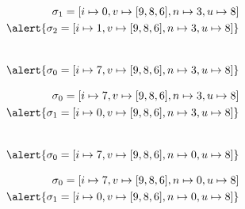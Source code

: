 \documentclass{beamer}
\begin{document}
\begin{frame}
\begin{align*}
  \sigma_1=[i\mapsto0,v\mapsto[9,8,6],n\mapsto3,u\mapsto8]
\\
  \alert{\sigma_2=[i\mapsto1,v\mapsto[9,8,6],n\mapsto3,u\mapsto8]}
\end{align*}
\begin{center}
\end{center}
\end{frame}

\begin{frame}
\begin{align*}
\\
  \alert{\sigma_0=[i\mapsto7,v\mapsto[9,8,6],n\mapsto3,u\mapsto8]}
\end{align*}
\begin{center}
\end{center}
\end{frame}

\begin{frame}
\begin{align*}
  \sigma_0=[i\mapsto7,v\mapsto[9,8,6],n\mapsto3,u\mapsto8]
\\
  \alert{\sigma_1=[i\mapsto0,v\mapsto[9,8,6],n\mapsto3,u\mapsto8]}
\end{align*}
\begin{center}
\end{center}
\end{frame}

\begin{frame}
\begin{align*}
\\
  \alert{\sigma_0=[i\mapsto7,v\mapsto[9,8,6],n\mapsto0,u\mapsto8]}
\end{align*}
\begin{center}
\end{center}
\end{frame}

\begin{frame}
\begin{align*}
  \sigma_0=[i\mapsto7,v\mapsto[9,8,6],n\mapsto0,u\mapsto8]
\\
  \alert{\sigma_1=[i\mapsto0,v\mapsto[9,8,6],n\mapsto0,u\mapsto8]}
\end{align*}
\begin{center}
\end{center}
\end{frame}
\end{document}
